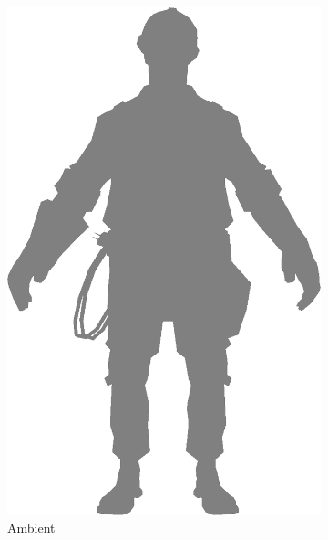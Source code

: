 
\begin{figure}[h]
    \centering
        \begin{subfigure}[b]{0.16\textwidth}
        \includegraphics[width=\textwidth]{img/Lighting/ambient.png}
        \caption{Ambient}
        \label{fig:ambient}
    \end{subfigure}
    ~
    \centering
    \begin{subfigure}[b]{0.16\textwidth}

\end{subfigure}
\end{figure}
